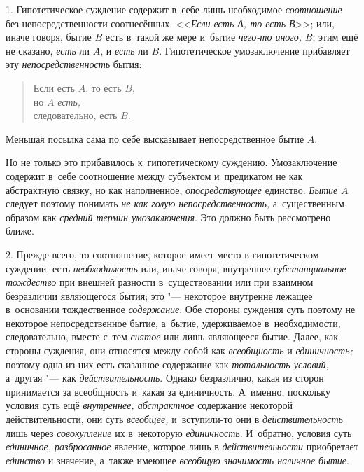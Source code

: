 1. Гипотетическое суждение содержит в~себе лишь необходимое
{\em соотношение} без непосредственности соотнесённых.
<<{\em Если есть А, то есть В}>>; или, иначе говоря, бытие $B$ есть в~такой же
мере и~бытие {\em чего-то иного,} $B$; этим ещё не сказано, {\em есть} ли
$A$, и {\em есть} ли $B$. Гипотетическое умозаключение прибавляет эту
{\em непосредственность} бытия:

\begin{verse}
Если есть $A$, то есть $B$,\\
но $A$ {\em есть,}\\
следовательно, есть $B$.
\end{verse}

Меньшая посылка сама по себе высказывает непосредственное бытие $A$.

Но не только это прибавилось к~гипотетическому суждению.
Умозаключение содержит в~себе соотношение между субъектом и~предикатом не
как абстрактную связку, но как наполненное, {\em опосредствующее}
единство. {\em Бытие} $A$ следует поэтому понимать
{\em не как голую непосредственность,} а~существенным образом как
{\em средний термин умозаключения}. Это должно быть рассмотрено ближе.

2. Прежде всего, то соотношение, которое имеет место в
гипотетическом суждении, есть {\em необходимость} или,
иначе говоря, внутреннее {\em субстанциальное тождество}
при внешней разности в~существовании или при
взаимном безразличии являющегося бытия; это "--- некоторое
внутренне лежащее в~основании тождественное {\em содержание}. Обе
стороны суждения суть поэтому не некоторое непосредственное бытие, а~бытие,
удерживаемое в~необходимости, следовательно, вместе с~тем {\em снятое} или лишь
являющееся бытие. Далее, как стороны суждения, они относятся между собой
как {\em всеобщность} и {\em единичность;}
поэтому одна из них есть сказанное содержание как
{\em тотальность условий,} а~другая "--- как {\em действительность}.
Однако безразлично, какая из сторон принимается за
всеобщность и~какая за единичность. А~именно, поскольку условия суть ещё
{\em внутреннее, абстрактное}
содержание некоторой действительности, они суть
{\em всеобщее,} и~вступили-то они в {\em действительность}
лишь через {\em совокупление} их в~некоторую {\em единичность}.
И~обратно, условия суть {\em единичное, разбросанное}
явление, которое лишь в {\em действительности} приобретает {\em единство} и
значение, а~также имеющее {\em всеобщую значимость наличное бытие}.

